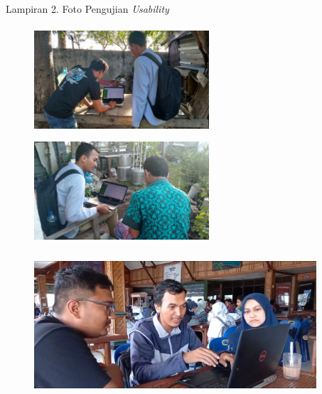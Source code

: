 \begin{appendices}{Lampiran 2. Foto Pengujian \textit{Usability}}
        

    \begin{figure}[H]
        \includegraphics[width=6.5cm,height=4cm]{gambar/dokumentasi/foto7}
        \hspace*{0.2cm}
        \includegraphics[width=6.5cm,height=4cm]{gambar/dokumentasi/foto8}
    \end{figure}
    \begin{figure}[H]
        \hspace*{1.5cm}
        \includegraphics[width=10.5cm,height=5cm]{gambar/dokumentasi/doku testi}
    \end{figure}
        
        
\end{appendices}

\newpage

